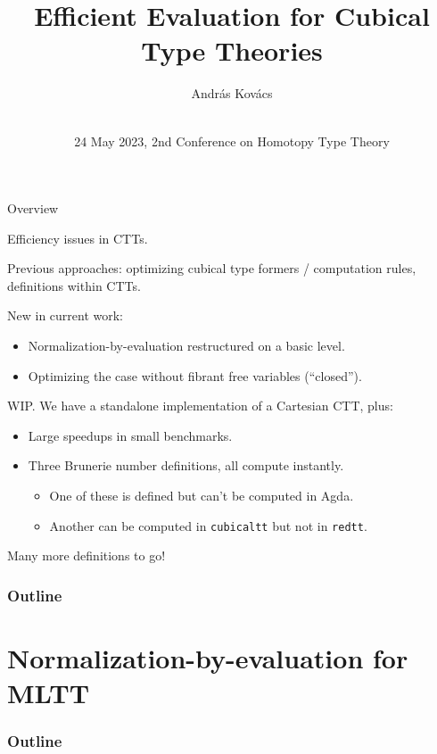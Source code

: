 \documentclass[dvipsnames]{beamer}
\title{Efficient Evaluation for Cubical Type Theories}
\author{András Kovács\inst{1} \\ \vspace{0.5em}{\small j.w.w. Evan Cavallo, Tom Jack, Anders Mörtberg} \\}
\institute{
  \inst{1}%
       {Eötvös Loránd University}
}
\date{24 May 2023, 2nd Conference on Homotopy Type Theory}
\begin{document}
\frame{\titlepage}

\begin{frame}{Overview}

Efficiency issues in CTTs.
\vspace{1em}
\pause

Previous approaches: optimizing cubical type formers / computation rules,
definitions within CTTs.
\vspace{0.5em}
\pause

New in current work:
\begin{itemize}
  \item Normalization-by-evaluation restructured on a basic level.
  \item Optimizing the case without fibrant free variables (``closed'').
\end{itemize}
\vspace{0.5em}
\pause

WIP. We have a standalone implementation of a Cartesian CTT, plus:
\begin{itemize}
  \item Large speedups in small benchmarks.
  \pause
  \item Three Brunerie number definitions, all compute instantly.
    \begin{itemize}
      \item One of these is defined but can't be computed in Agda.
      \item Another can be computed in \texttt{cubicaltt} but not
            in \texttt{redtt}.
    \end{itemize}
\end{itemize}
\vspace{0.5em}
\pause
Many more definitions to go!
\end{frame}

\begin{frame}
  \frametitle{Outline}
  \tableofcontents
\end{frame}

\section{Normalization-by-evaluation for MLTT}
\begin{frame}
  \frametitle{Outline}
  \tableofcontents[currentsection]
\end{frame}
\end{document}
